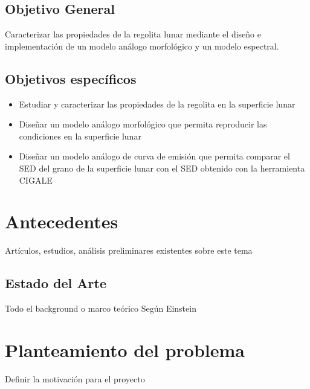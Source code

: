 \documentclass[12pt]{article}
\begin{document}
\subsection{Objetivo General}
Caracterizar las propiedades de la regolita lunar mediante el diseño e  implementación de un modelo análogo morfológico y un modelo espectral.

\subsection{Objetivos específicos}
\begin{itemize}
    \item Estudiar y caracterizar las propiedades de la regolita  en la superficie lunar
    \item Diseñar un modelo análogo morfológico que permita reproducir las condiciones en la superficie lunar %
    \item Diseñar un modelo análogo de curva de emisión que permita comparar el SED del grano de la superficie lunar con el SED obtenido con la herramienta CIGALE
\end{itemize}

\section{Antecedentes}
Artículos, estudios, análisis preliminares existentes sobre este tema
\subsection{Estado del Arte}
Todo el background o marco teórico Según Einstein
\section{Planteamiento del problema}
Definir la motivación para el proyecto
\end{document}
